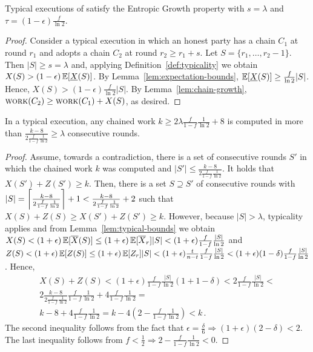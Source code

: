 
\begin{theorem} \label{thm:entropic-growth}
  Typical executions of \poem satisfy the Entropic Growth property
  with $s = \lambda$ and $\tau = (1 - \epsilon)\frac{f}{\ln2}$.
\end{theorem}
\begin{proof}
  Consider a typical \poem execution in which an honest party has a chain $C_1$
  at round $r_1$ and adopts a chain $C_2$ at round $r_2 \geq r_1 + s$.
  Let $S = \{r_1, \ldots, r_2 - 1\}$. Then $|S| \geq s = \lambda$ and,
  applying Definition~\ref{def:typicality} we obtain $X(S) > (1 - \epsilon)\E[\underline{X}(S)]$.
  By
  Lemma~\ref{lem:expectation-bounds}, $\E[\underline{X}(S)] \geq \frac{f}{\ln2}|S|$.
  Hence, $X(S) > (1 - \epsilon)\frac{f}{\ln2}|S|$.
  By Lemma~\ref{lem:chain-growth}, $\work(C_2) \geq \work(C_1) + X(S)$, as desired.
  \Qed
\end{proof}

\pagebreak
\begin{lemma} \label{lem:patience}
  In a typical execution, any chained work $k \geq 2 \lambda \frac{f}{1 - f} \frac{1}{\ln2} + 8$ is computed
  in more than $\frac{k - 8}{2 \frac{f}{1 - f} \frac{1}{\ln2}} \geq \lambda$ consecutive rounds.
\end{lemma}
\begin{proof}
  Assume, towards a contradiction, there is a set of consecutive rounds $S'$ in which
  the chained work $k$ was computed and $|S'| \leq \frac{k - 8}{2 \frac{f}{1 - f} \frac{1}{\ln2}}$.
  It holds that $X(S') + Z(S') \geq k$.
  Then, there is a set $S \supseteq S'$ of consecutive rounds with
  $|S| = \ceil*{\frac{k - 8}{2 \frac{f}{1 - f} \frac{1}{\ln2}}} + 1 < \frac{k - 8}{2 \frac{f}{1 - f} \frac{1}{\ln2}} + 2$
  such that $X(S) + Z(S) \geq X(S') + Z(S') \geq k$. However,
  because $|S| > \lambda$, typicality applies and from Lemma~\ref{lem:typical-bounds} we obtain
  $X(S) < (1 + \epsilon) \E[\overline{X}(S)] \leq (1 + \epsilon) \E[\overline{X}_r] |S| <
  (1 + \epsilon) \frac{f}{1 - f} \frac{|S|}{\ln2}$
  and
  $Z(S) < (1 + \epsilon) \E[Z(S)] \leq (1 + \epsilon) \E[Z_r] |S| <
  (1 + \epsilon) \frac{t}{n - t} \frac{f}{1 - f}\frac{|S|}{\ln2} <
  (1 + \epsilon) (1 - \delta) \frac{f}{1 - f}\frac{|S|}{\ln2}$.
  Hence,
  \begin{align*}
    X(S) + Z(S) < (1 + \epsilon) \frac{f}{1 - f} \frac{|S|}{\ln2} (1 + 1 - \delta) <
    2 \frac{f}{1 - f} \frac{|S|}{\ln2} <\\
    2\frac{k - 8}{2 \frac{f}{1 - f} \frac{1}{\ln2}} \frac{f}{1 - f} \frac{1}{\ln2} + 4 \frac{f}{1 - f} \frac{1}{\ln2} =\\
    k - 8 + 4 \frac{f}{1 - f} \frac{1}{\ln2} = k - 4 \left(2 - \frac{f}{1 - f} \frac{1}{\ln2}\right) < k\,.
  \end{align*}
  The second inequality follows from the fact that $\epsilon =\frac{\delta}{6} \Rightarrow (1 + \epsilon)(2 - \delta) < 2$.
  The last inequality follows from $f < \frac{1}{2} \Rightarrow 2 - \frac{f}{1 - f} \frac{1}{\ln2} < 0$.
  \Qed
\end{proof}

